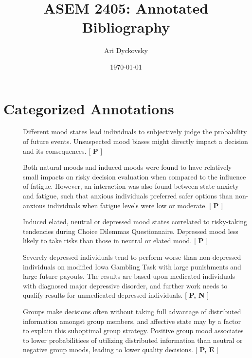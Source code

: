 \documentclass[12pt,a4paper]{article}
\title{ASEM 2405: Annotated Bibliography}
\author{Ari Dyckovsky}
\date{\today}
\newcommand{\categorization}[1]{[ \textbf{ #1 } ]}
\begin{document}
\maketitle

\section*{Categorized Annotations}

\begin{description}

  \item[\textcite{Wright1992}] Different mood states lead individuals to
subjectively judge the probability of future events. Unsuspected mood biases
might directly impact a decision and its consequences. \categorization{P}

  \item[\textcite{Hockey2000}] Both natural moods and induced moods were found to
have relatively small impacts on risky decision evaluation when compared to the
influence of fatigue. However, an interaction was also found between state
anxiety and fatigue, such that anxious individuals preferred safer options than
non-anxious individuals when fatigue levels were low or moderate. \categorization{P}

  \item[\textcite{Yuen2003}] Induced elated, neutral or depressed mood states correlated
to risky-taking tendencies during Choice Dilemmas Questionnaire. Depressed mood
less likely to take risks than those in neutral or elated mood. \categorization{P}

  \item[\textcite{Must2006}] Severely depressed individuals tend to perform worse
than non-depressed individuals on modified Iowa Gambling Task with large
punishments and large future payouts. The results are based upon medicated
individuals with diagnosed major depressive disorder, and further work needs to
qualify results for unmedicated depressed individuals. \categorization{P, N}

  \item[\textcite{VanKnippenberg2010}] Groups make decisions often without taking
full advantage of distributed information amongst group members, and affective
state may by a factor to explain this suboptimal group strategy. Positive group
mood associates to lower probabilitiees of utilizing distributed information
than neutral or negative group moods, leading to lower quality decisions. \categorization{P, E}


\end{description}
\end{document}
